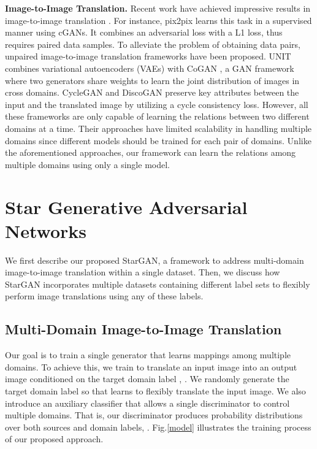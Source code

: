 \documentclass[10pt,twocolumn,letterpaper]{article}
\begin{document}
\noindent \textbf{Image-to-Image Translation.} Recent work have achieved impressive results in image-to-image translation \cite{Isola_2017_CVPR, kim2017learning,liu2017unsupervised,zhu2017unpaired}. For instance, pix2pix \cite{Isola_2017_CVPR} learns this task in a supervised manner using cGANs\cite{mirza2014conditional}. It combines an adversarial loss with a L1 loss, thus requires paired data samples. To alleviate the problem of obtaining data pairs, unpaired image-to-image translation frameworks \cite{kim2017learning,liu2017unsupervised,zhu2017unpaired} have been proposed.
UNIT \cite{liu2017unsupervised} combines variational autoencoders (VAEs) \cite{kingma2013auto} with CoGAN \cite{liu2016coupled}, a GAN framework where two generators share weights to learn the joint distribution of images in cross domains. CycleGAN \cite{zhu2017unpaired} and DiscoGAN \cite{kim2017learning} preserve key attributes between the input and the translated image by utilizing a cycle consistency loss. However, all these frameworks are only capable of learning the relations between two different domains at a time. Their approaches have limited scalability in handling multiple domains since different models should be trained for each pair of domains. Unlike the aforementioned approaches, our framework can learn the relations among multiple domains using only a single model.



\section{Star Generative Adversarial Networks} \label{stargan}

We first describe our proposed StarGAN, a framework to address multi-domain image-to-image translation within a single dataset. Then, we discuss how StarGAN  incorporates multiple datasets containing different label sets to flexibly perform image translations using any of these labels. 
\subsection{Multi-Domain Image-to-Image Translation} 
Our goal is to train a single generator  that learns mappings among multiple domains. To achieve this, we train  to translate an input image   into an output image  conditioned on the target domain label , . 
We randomly generate the target domain label  so that  learns to flexibly translate the input image. We also introduce an auxiliary classifier \cite{odena2016conditional} that allows a single discriminator to control multiple domains. That is,  our discriminator produces probability distributions over both sources and domain labels, . Fig.\thinspace\ref{model} illustrates the training process of our proposed approach.
\end{document}

